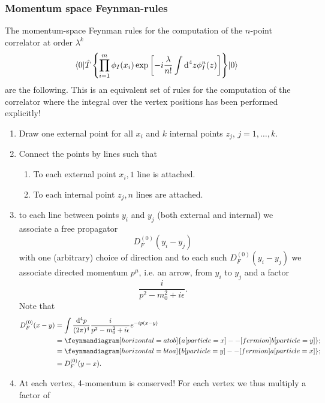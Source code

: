 \subsubsection{Momentum space Feynman-rules}
The momentum-space Feynman rules for the computation of the $n$-point correlator at order $\lambda^k$
\begin{equation}
\expval{\hat{T} \left\{ \prod_{i=1}^{m} \phi_I(x_i) \exp\left[-i  \frac{\lambda}{n!} \int \mathrm{d}^4 z \phi^n_I(z) \right] 	\right\}}{0}
\end{equation}
are the following. This is an equivalent set of rules for the computation of the correlator where the integral over the vertex positions has been performed explicitly!
\begin{enumerate}
	\item Draw one external point for all $x_i$ and $k$ internal points $z_j$, $j=1,\dots,k$.
	\item Connect the points by lines such that
	\begin{enumerate}
		\item To each external point $x_i, 1$ line is attached.
		\item To each internal point $z_j, n$ lines are attached.
	\end{enumerate}
\item to each line between points $y_i$ and $y_j$ (both external and internal) we associate a free propagator 
\begin{equation}
	D^{(0)}_F(y_i-y_j)
\end{equation}
with one (arbitrary) choice of direction and to each such $D^{(0)}_F(y_i-y_j)$ we associate directed momentum $p^\mu$, i.e. an arrow, from $y_i$ to $y_j$ and a factor
\begin{equation}
	\frac{i}{p^2-m^2_0+i \epsilon}.
\end{equation}
Note that 
\begin{align*}
	D^{(0)}_F (x-y) &= \int \frac{\md^4p}{(2 \pi)^4} \frac{i}{p^2-m^2_0+i \epsilon} e^{-i p(x-y)} \\
								&=\feynmandiagram [horizontal=a to b] {a[particle=x] -- [fermion] b[particle=y]}; \\
								&=\feynmandiagram [horizontal=b to a] {b[particle=y] --  [fermion]a[particle=x]};\\
						&=D^{(0)}_F (y-x).
\end{align*}
\item At each vertex, 4-momentum is conserved! For each vertex we thus multiply a factor of 
\begin{equation}

\end{equation}
\end{enumerate}

